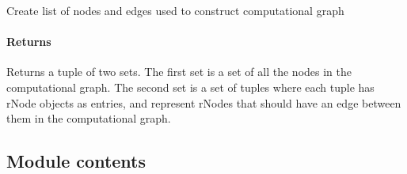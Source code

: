 \documentclass[letterpaper,10pt,english]{sphinxmanual}
\begin{document}
\begin{fulllineitems}
\begin{fulllineitems}
\begin{description}
\end{description}

\end{fulllineitems}


\begin{fulllineitems}
\label{\detokenize{autodiff:autodiff.rNode.rNode.graph_object}}
\pysigstartsignatures
{}
\pysigstopsignatures
\sphinxAtStartPar
Create list of nodes and edges used to construct computational graph


\paragraph{Returns}
\label{\detokenize{autodiff:id50}}\begin{description}
\sphinxAtStartPar
Returns a tuple of two sets. The first set is a set of all the nodes
in the computational graph. The second set is a set of tuples where each tuple
has rNode objects as entries, and represent rNodes that should have an edge
between them in the computational graph.

\end{description}

\end{fulllineitems}


\begin{fulllineitems}
\label{\detokenize{autodiff:autodiff.rNode.rNode.increment}}
\pysigstartsignatures
{}
\pysigstopsignatures
\end{fulllineitems}


\end{fulllineitems}



\subsection{Module contents}
\label{\detokenize{autodiff:module-autodiff}}\label{\detokenize{autodiff:module-contents}}
\end{document}
